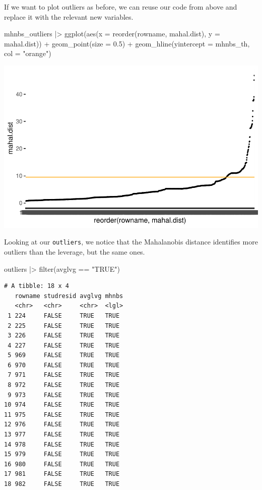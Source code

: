 \documentclass[
  letterpaper,
]{krantz}
\makeatletter
\newenvironment{Shaded}{\begin{snugshade}}{\end{snugshade}}
\newcommand{\AttributeTok}[1]{\textcolor[rgb]{0.40,0.45,0.13}{#1}}
\newcommand{\FloatTok}[1]{\textcolor[rgb]{0.68,0.00,0.00}{#1}}
\newcommand{\FunctionTok}[1]{\textcolor[rgb]{0.28,0.35,0.67}{#1}}
\newcommand{\NormalTok}[1]{\textcolor[rgb]{0.00,0.23,0.31}{#1}}
\newcommand{\SpecialCharTok}[1]{\textcolor[rgb]{0.37,0.37,0.37}{#1}}
\newcommand{\StringTok}[1]{\textcolor[rgb]{0.13,0.47,0.30}{#1}}
\newenvironment{kframe}{%
\medskip{}
\setlength{\fboxsep}{.8em}
 \def\at@end@of@kframe{}%
 \ifinner\ifhmode%
  \def\at@end@of@kframe{\end{minipage}}%
  \begin{minipage}{\columnwidth}%
 \fi\fi%
 \def\FrameCommand##1{\hskip\@totalleftmargin \hskip-\fboxsep
 \colorbox{shadecolor}{##1}\hskip-\fboxsep
     \hskip-\linewidth \hskip-\@totalleftmargin \hskip\columnwidth}%
 \MakeFramed {\advance\hsize-\width
   \@totalleftmargin\z@ \linewidth\hsize
   \@setminipage}}%
 {\par\unskip\endMakeFramed%
 \at@end@of@kframe}
\renewenvironment{Shaded}{\begin{kframe}}{\end{kframe}}
\makeatother
\begin{document}
If we want to plot outliers as before, we can reuse our code from above
and replace it with the relevant new variables.

\begin{Shaded}
\begin{Highlighting}[]
\NormalTok{mhnbs\_outliers }\SpecialCharTok{|\textgreater{}}
  \FunctionTok{ggplot}\NormalTok{(}\FunctionTok{aes}\NormalTok{(}\AttributeTok{x =} \FunctionTok{reorder}\NormalTok{(rowname, mahal.dist),}
             \AttributeTok{y =}\NormalTok{ mahal.dist)) }\SpecialCharTok{+}
  \FunctionTok{geom\_point}\NormalTok{(}\AttributeTok{size =} \FloatTok{0.5}\NormalTok{) }\SpecialCharTok{+}
  \FunctionTok{geom\_hline}\NormalTok{(}\AttributeTok{yintercept =}\NormalTok{ mhnbs\_th, }\AttributeTok{col =} \StringTok{"orange"}\NormalTok{)}
\end{Highlighting}
\end{Shaded}

\includegraphics{13_regressions_files/figure-pdf/mahalanobis-distance-plot-1.pdf}

Looking at our \texttt{outliers}, we notice that the Mahalanobis
distance identifies more outliers than the leverage, but the same ones.

\begin{Shaded}
\begin{Highlighting}[]
\NormalTok{outliers }\SpecialCharTok{|\textgreater{}} \FunctionTok{filter}\NormalTok{(avglvg }\SpecialCharTok{==} \StringTok{"TRUE"}\NormalTok{)}
\end{Highlighting}
\end{Shaded}

\begin{verbatim}
# A tibble: 18 x 4
   rowname studresid avglvg mhnbs
   <chr>   <chr>     <chr>  <lgl>
 1 224     FALSE     TRUE   TRUE 
 2 225     FALSE     TRUE   TRUE 
 3 226     FALSE     TRUE   TRUE 
 4 227     FALSE     TRUE   TRUE 
 5 969     FALSE     TRUE   TRUE 
 6 970     FALSE     TRUE   TRUE 
 7 971     FALSE     TRUE   TRUE 
 8 972     FALSE     TRUE   TRUE 
 9 973     FALSE     TRUE   TRUE 
10 974     FALSE     TRUE   TRUE 
11 975     FALSE     TRUE   TRUE 
12 976     FALSE     TRUE   TRUE 
13 977     FALSE     TRUE   TRUE 
14 978     FALSE     TRUE   TRUE 
15 979     FALSE     TRUE   TRUE 
16 980     FALSE     TRUE   TRUE 
17 981     FALSE     TRUE   TRUE 
18 982     FALSE     TRUE   TRUE 
\end{verbatim}
\end{document}
